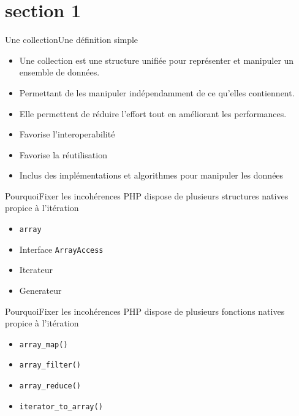 \section{section 1}
\begin{frame}{Une collection}{Une définition simple}
    \begin{itemize}
        \item Une collection est une structure unifiée pour représenter et manipuler un ensemble de données.
        \item Permettant de les manipuler indépendamment de ce qu'elles contiennent.
        \item Elle permettent de réduire l'effort tout en améliorant les performances\footnotemark.
        \item Favorise l'interoperabilité
        \item Favorise la réutilisation
        \item Inclus des implémentations et algorithmes pour manipuler les données
    \end{itemize}

\end{frame}

\begin{frame}{Pourquoi}{Fixer les incohérences}
    PHP dispose de plusieurs structures natives propice à l'itération

    \begin{itemize}[<+->]
        \item \texttt{array}
        \item Interface \texttt{ArrayAccess}
        \item Iterateur
        \item Generateur
    \end{itemize}
\end{frame}

\begin{frame}{Pourquoi}{Fixer les incohérences}
    PHP dispose de plusieurs fonctions natives propice à l'itération

    \begin{itemize}[<+->]
        \item \texttt{array\_map()}
        \item \texttt{array\_filter()}
        \item \texttt{array\_reduce()}
        \item \texttt{iterator\_to\_array()}
    \end{itemize}
\end{frame}


